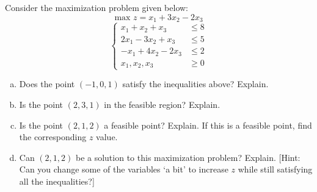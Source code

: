 \documentclass[11pt,letterpaper]{article}
\begin{document}
\newpage



 Consider the maximization problem given below:
	\[
	\text{max } z= x_1 + 3x_2 - 2x_3
	\]
	\[
	\left\{
	\begin{aligned}
	x_1 + x_2 + x_3&\leq 8 \\
	2x_1 - 3x_2 + x_3&\leq 5 \\
	-x_1 + 4x_2 - 2x_3&\leq 2 \\
	x_1, x_2, x_3&\geq 0
	\end{aligned} \right.
	\]
\begin{enumerate}[(a)]
\item Does the point $(-1, 0, 1)$ satisfy the inequalities above? Explain.
\item Is the point $(2, 3, 1)$ in the feasible region? Explain. 
\item Is the point $(2, 1, 2)$ a feasible point? Explain. If this is a feasible point, find the corresponding $z$ value.
\item Can $(2, 1, 2)$ be a solution to this maximization problem? Explain. [Hint: Can you change some of the variables `a bit' to increase $z$ while still satisfying all the inequalities?]
\end{enumerate} 
\end{document}
